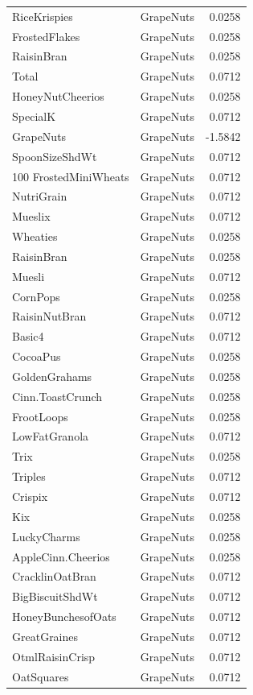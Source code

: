 \begin{longtable}{llr}
RiceKrispies & GrapeNuts & 0.0258 \\
FrostedFlakes & GrapeNuts & 0.0258 \\
RaisinBran & GrapeNuts & 0.0258 \\
Total & GrapeNuts & 0.0712 \\
HoneyNutCheerios & GrapeNuts & 0.0258 \\
SpecialK & GrapeNuts & 0.0712 \\
GrapeNuts & GrapeNuts & -1.5842 \\
SpoonSizeShdWt & GrapeNuts & 0.0712 \\
100%
FrostedMiniWheats & GrapeNuts & 0.0712 \\
NutriGrain & GrapeNuts & 0.0712 \\
Mueslix & GrapeNuts & 0.0712 \\
Wheaties & GrapeNuts & 0.0258 \\
RaisinBran & GrapeNuts & 0.0258 \\
Muesli & GrapeNuts & 0.0712 \\
CornPops & GrapeNuts & 0.0258 \\
RaisinNutBran & GrapeNuts & 0.0712 \\
Basic4 & GrapeNuts & 0.0712 \\
CocoaPus & GrapeNuts & 0.0258 \\
GoldenGrahams & GrapeNuts & 0.0258 \\
Cinn.ToastCrunch & GrapeNuts & 0.0258 \\
FrootLoops & GrapeNuts & 0.0258 \\
LowFatGranola & GrapeNuts & 0.0712 \\
Trix & GrapeNuts & 0.0258 \\
Triples & GrapeNuts & 0.0712 \\
Crispix & GrapeNuts & 0.0712 \\
Kix & GrapeNuts & 0.0258 \\
LuckyCharms & GrapeNuts & 0.0258 \\
AppleCinn.Cheerios & GrapeNuts & 0.0258 \\
CracklinOatBran & GrapeNuts & 0.0712 \\
BigBiscuitShdWt & GrapeNuts & 0.0712 \\
HoneyBunchesofOats & GrapeNuts & 0.0712 \\
GreatGraines & GrapeNuts & 0.0712 \\
OtmlRaisinCrisp & GrapeNuts & 0.0712 \\
OatSquares & GrapeNuts & 0.0712 \\

\end{longtable}
